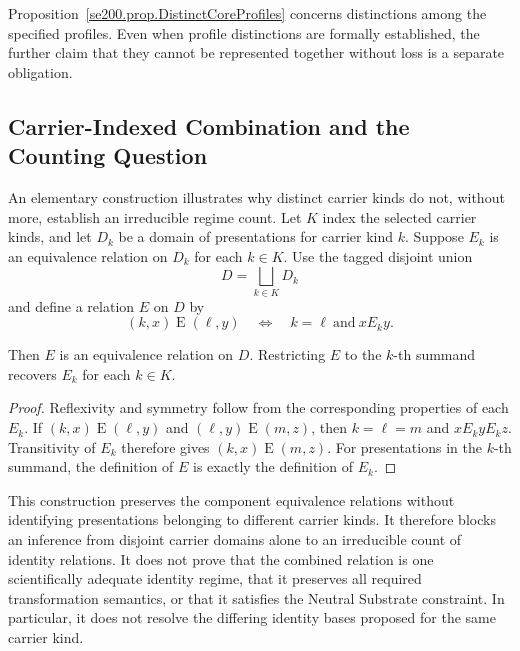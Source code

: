 Proposition~\ref{se200.prop.DistinctCoreProfiles} concerns distinctions
among the specified profiles.
Even when profile distinctions are formally established, the further
claim that they cannot be represented together without loss is a
separate obligation.

\subsection{Carrier-Indexed Combination and the Counting Question}
\label{subsec:amalgamation}

An elementary construction illustrates why distinct carrier kinds do
not, without more, establish an irreducible regime count.
Let $K$ index the selected carrier kinds, and let $D_k$ be a domain
of presentations for carrier kind $k$.
Suppose $E_k$ is an equivalence relation on $D_k$ for each $k\in K$.
Use the tagged disjoint union
\[
D = \bigsqcup_{k\in K} D_k
\]
and define a relation $E$ on $D$ by
\[
(k,x)\mathrel{E}(\ell,y)
\quad\Longleftrightarrow\quad
k=\ell\ \text{and}\ x\mathrel{E_k}y.
\]

\begin{proposition}
\label{se200.prop.CarrierIndexedCombination}
Then $E$ is an equivalence relation on $D$.
Restricting $E$ to the $k$-th summand recovers $E_k$
for each $k\in K$.
\end{proposition}

\begin{proof}
Reflexivity and symmetry follow from the corresponding properties
of each $E_k$.
If $(k,x)\mathrel{E}(\ell,y)$ and
$(\ell,y)\mathrel{E}(m,z)$, then $k=\ell=m$ and
$x\mathrel{E_k}y\mathrel{E_k}z$.
Transitivity of $E_k$ therefore gives $(k,x)\mathrel{E}(m,z)$.
For presentations in the $k$-th summand, the definition of $E$
is exactly the definition of $E_k$.
\end{proof}

This construction preserves the component equivalence relations
without identifying presentations belonging to different carrier kinds.
It therefore blocks an inference from disjoint carrier domains alone
to an irreducible count of identity relations.
It does not prove that the combined relation is one scientifically
adequate identity regime, that it preserves all required transformation
semantics, or that it satisfies the Neutral Substrate constraint.
In particular, it does not resolve the differing identity bases
proposed for the same carrier kind.

